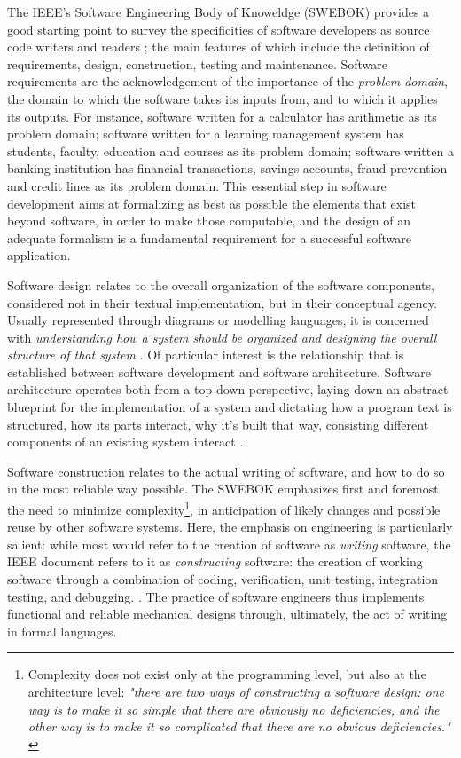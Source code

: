The IEEE's Software Engineering Body of Knoweldge (SWEBOK) provides a good starting point to survey the specificities of software developers as source code writers and readers \citep{bourque_swebok_2014}; the main features of which include the definition of requirements, design, construction, testing and maintenance. Software requirements are the acknowledgement of the importance of the \emph{problem domain}, the domain to which the software takes its inputs from, and to which it applies its outputs. For instance, software written for a calculator has arithmetic as its problem domain; software written for a learning management system has students, faculty, education and courses as its problem domain; software written a banking institution has financial transactions, savings accounts, fraud prevention and credit lines as its problem domain. This essential step in software development aims at formalizing as best as possible the elements that exist beyond software, in order to make those computable, and the design of an adequate formalism is a fundamental requirement for a successful software application.

Software design relates to the overall organization of the software components, considered not in their textual implementation, but in their conceptual agency. Usually represented through diagrams or modelling languages, it is concerned with \emph{understanding how a system should be organized and designing the overall structure of that system} \citep{sommerville_software_2010}. Of particular interest is the relationship that is established between software development and software architecture. Software architecture operates both from a top-down perspective, laying down an abstract blueprint for the implementation of a system and dictating how a program text is structured, how its parts interact, why it's built that way, consisting different components of an existing system interact \citep{brown_architecture_2011}.

Software construction relates to the actual writing of software, and how to do so in the most reliable way possible. The SWEBOK emphasizes first and foremost the need to minimize complexity\footnote{Complexity does not exist only at the programming level, but also at the architecture level: \emph{"there are two ways of constructing a software design: one way is to make it so simple that there are obviously no deficiencies, and the other way is to make it so complicated that there are no obvious deficiencies."} \citep{hoare_emperor_1981}}, in anticipation of likely changes and possible reuse by other software systems. Here, the emphasis on engineering is particularly salient: while most would refer to the creation of software as \emph{writing} software, the IEEE document refers to it as \emph{constructing} software: the creation of working software through a combination of coding, verification, unit testing, integration testing, and debugging. \citep{bourque_swebok_2014}. The practice of software engineers thus implements functional and reliable mechanical designs through, ultimately, the act of writing in formal languages.

